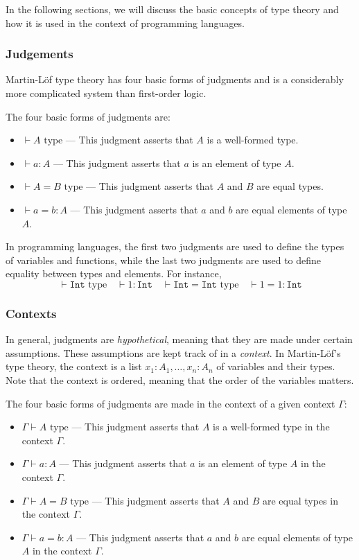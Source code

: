 In the following sections, we will discuss the basic concepts of type theory and how it is used in the context of programming languages.

\subsubsection{Judgements}\label{subsubsec:Judgements}

Martin-L\"of type theory has four basic forms of judgments and is a considerably more complicated system than first-order logic.

The four basic forms of judgments are:
\begin{itemize}
    \item $\vdash A \textrm{ type}$ --- This judgment asserts that $A$ is a well-formed type.
    \item $\vdash a : A$ --- This judgment asserts that $a$ is an element of type $A$.
    \item $\vdash A = B \textrm{ type}$ --- This judgment asserts that $A$ and $B$ are equal types.
    \item $\vdash a = b : A$ --- This judgment asserts that $a$ and $b$ are equal elements of type $A$.
\end{itemize}

In programming languages, the first two judgments are used to define the types of variables and functions, while the last two judgments are used to define equality between types and elements.
For instance,
$$
\vdash \texttt{Int} \textrm{ type} \quad \vdash 1 : \texttt{Int} \quad \vdash \texttt{Int} = \texttt{Int} \textrm{ type} \quad \vdash 1 = 1 : \texttt{Int}
$$

\subsubsection{Contexts}\label{subsubsec:Contexts}

In general, judgments are \textit{hypothetical}, meaning that they are made under certain assumptions. These assumptions are kept track of in a \textit{context}.
In Martin-L\"of's type theory, the context is a list $x_1 : A_1, \ldots, x_n : A_n$ of variables and their types. Note that the context is ordered, meaning that the order of the variables matters.

The four basic forms of judgments are made in the context of a given context $\Gamma$:
\begin{itemize}
    \item $\Gamma \vdash A \textrm{ type}$ --- This judgment asserts that $A$ is a well-formed type in the context $\Gamma$.
    \item $\Gamma \vdash a : A$ --- This judgment asserts that $a$ is an element of type $A$ in the context $\Gamma$.
    \item $\Gamma \vdash A = B \textrm{ type}$ --- This judgment asserts that $A$ and $B$ are equal types in the context $\Gamma$.
    \item $\Gamma \vdash a = b : A$ --- This judgment asserts that $a$ and $b$ are equal elements of type $A$ in the context $\Gamma$.
\end{itemize}

